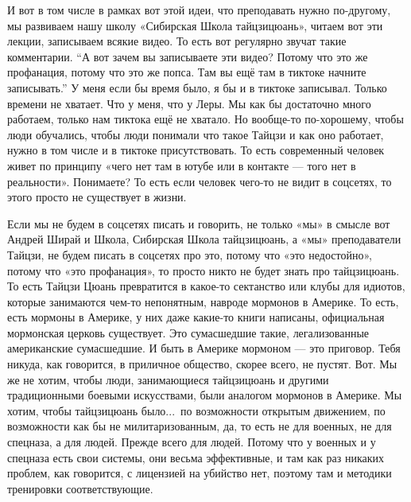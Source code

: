 И вот в том числе в рамках вот этой идеи, 
что преподавать нужно по-другому, мы развиваем нашу 
школу «Сибирская Школа тайцзицюань», читаем вот эти 
лекции, записываем всякие видео. То есть вот регулярно 
звучат такие комментарии. ``А вот зачем вы записываете 
эти видео? Потому что это же профанация, потому что это 
же попса. Там вы ещё там в тиктоке начните записывать.''
У меня если бы время было, я бы и в тиктоке записывал. 
Только времени не хватает. Что у меня, что у Леры.
Мы как бы достаточно много работаем, только нам 
тиктока ещё не хватало. Но вообще-то по-хорошему, чтобы люди 
обучались, чтобы люди понимали что такое Тайцзи и как 
оно работает, нужно в том числе и в тиктоке 
присутствовать. То есть современный человек живет по 
принципу «чего нет там в ютубе или в контакте --- того нет 
в реальности». Понимаете? То есть если человек чего-то 
не видит в соцсетях,  то этого просто не существует в 
жизни.

Если мы не будем в соцсетях писать и говорить, 
не только «мы» в смысле вот Андрей Ширай и Школа, 
Сибирская Школа тайцзицюань, а «мы» преподаватели 
Тайцзи, не будем писать в соцсетях про это, потому что 
«это недостойно», потому что «это профанация», то просто 
никто не будет знать про тайцзицюань. То есть Тайцзи 
Цюань превратится в какое-то сектанство или клубы для 
идиотов, которые занимаются чем-то непонятным, навроде 
мормонов в Америке.  То есть, есть мормоны в Америке, у 
них даже какие-то книги написаны,  официальная 
мормонская церковь существует.  Это сумасшедшие 
такие, легализованные американские сумасшедшие.  И 
быть в Америке мормоном --- это приговор. Тебя никуда, 
как говорится, в приличное общество, скорее всего, не 
пустят.  Вот. Мы же не хотим, чтобы люди, занимающиеся 
тайцзицюань и другими традиционными боевыми 
искусствами, были аналогом мормонов в Америке. Мы 
хотим, чтобы тайцзицюань было...\ по возможности 
открытым движением, по возможности как бы не 
милитаризованным,  да, то есть не для военных, не для 
спецназа, а для людей. Прежде всего для людей. Потому 
что у военных и у спецназа есть свои системы, они 
весьма эффективные,  и там как раз никаких проблем, как 
говорится, с лицензией на убийство нет, поэтому там и 
методики тренировки соответствующие.

